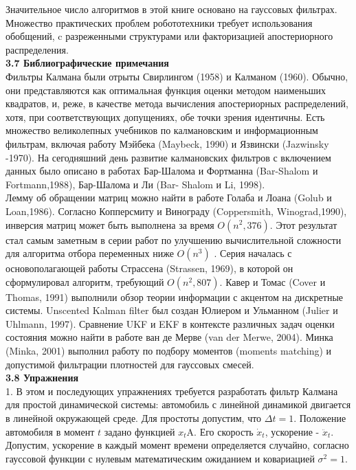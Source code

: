 \documentclass[10pt,a4paper]{article}
\begin{document}
Значительное число алгоритмов в этой книге основано на гауссовых фильтрах. Множество практических проблем робототехники требует использования обобщений, c разреженными структурами или факторизацией апостериорного распределения.\\

\textbf{3.7 Библиографические примечания}\\

Фильтры Калмана были отрыты Свирлингом (1958) и Калманом (1960). Обычно, они представляются как оптимальная функция оценки методом наименьших квадратов, и, реже, в качестве метода вычисления апостериорных распределений, хотя, при соответствующих допущениях, обе точки зрения идентичны. Есть множество великолепных учебников по калмановским и информационным фильтрам, включая работу Мэйбека (Maybeck, 1990) и Язвински (Jazwinsky -1970). На сегодняшний день развитие калмановских фильтров с включением данных было описано в работах Бар-Шалома и Фортманна (Bar-Shalom и Fortmann,1988), Бар-Шалома и Ли (Bar- Shalom и Li, 1998).\\

Лемму об обращении матриц можно найти в работе Голаба и Лоана (Golub и Loan,1986). Согласно Копперсмиту и Винограду (Coppersmith, Winograd,1990), инверсия матриц может быть выполнена за время $O(n^2,376)$. Этот результат стал самым заметным в серии работ по улучшению вычислительной сложности для алгоритма отбора переменных ниже $O(n^3)$ . Серия началась с основополагающей работы Страссена (Strassen, 1969), в которой он сформулировал алгоритм, требующий $O(n^2,807)$. Кавер и Томас (Cover и Thomas, 1991) выполнили обзор теории информации с акцентом на дискретные системы. Unscented Kalman filter был создан Юлиером и Ульманном (Julier и Uhlmann, 1997). Сравнение UKF и EKF в контексте различных задач оценки состояния можно найти в работе ван де Мерве (van der Merwe, 2004). Минка (Minka, 2001) выполнил работу по подбору моментов (moments matching) и допустимой фильтрации плотностей для гауссовых смесей.\\

\textbf{3.8 Упражнения}\\

1. В этом и последующих упражнениях требуется разработать фильтр Калмана для простой динамической системы: автомобиль с линейной динамикой двигается в линейной окружающей среде. Для простоты допустим, что $\varDelta t=1$. Положение автомобиля в момент $t$ задано функцией $x_t$A. Его скорость $\dot{x}_t$, ускорение - $\ddot{x}_t$. Допустим, ускорение  в каждый момент времени определяется случайно, согласно гауссовой функции с нулевым математическим ожиданием и ковариацией $\sigma^2=1$.\\
\end{document}
